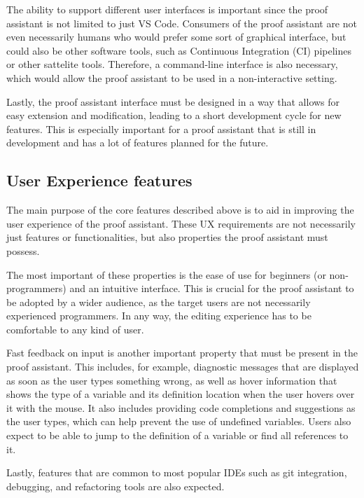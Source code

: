 The ability to support different user interfaces is important since the proof assistant is not limited to just VS Code.
Consumers of the proof assistant are not even necessarily humans who would prefer some sort of graphical interface,
but could also be other software tools, such as Continuous Integration (CI) pipelines or other sattelite tools.
Therefore, a command-line interface is also necessary, which would allow the proof assistant to be used in a non-interactive setting.

Lastly, the proof assistant interface must be designed in a way that allows for easy extension and modification,
leading to a short development cycle for new features.
This is especially important for a proof assistant that is still in development and has a lot of features planned for the future.


\subsection{User Experience features}

The main purpose of the core features described above is to aid in improving the user experience of the proof assistant.
These UX requirements are not necessarily just features or functionalities, but also properties the proof assistant must possess.

The most important of these properties is the ease of use for beginners (or non-programmers) and an intuitive interface.
This is crucial for the proof assistant to be adopted by a wider audience, as the target users are not necessarily
experienced programmers.
In any way, the editing experience has to be comfortable to any kind of user.

Fast feedback on input is another important property that must be present in the proof assistant.
This includes, for example, diagnostic messages that are displayed as soon as the user types something wrong,
as well as hover information that shows the type of a variable and its definition location when the user hovers over it with the mouse.
It also includes providing code completions and suggestions as the user types, which can help prevent the use of undefined variables.
Users also expect to be able to jump to the definition of a variable or find all references to it.

Lastly, features that are common to most popular IDEs such as git integration, debugging, and refactoring tools are also expected.

